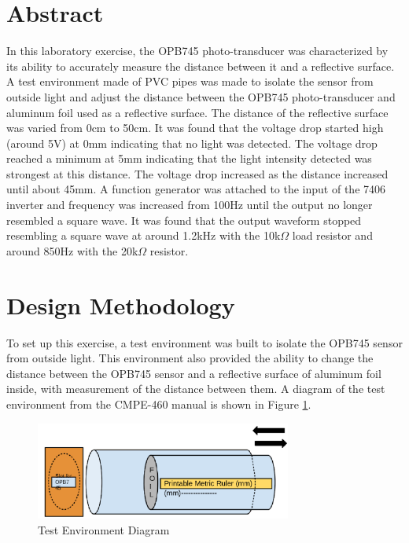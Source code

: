 \documentclass[CMPE]{KGCOEReport}
\begin{document}
\maketitle

\section*{Abstract}

In this laboratory exercise, the OPB745 photo-transducer was characterized by its ability to accurately measure the distance between it and a reflective surface. A test environment made of PVC pipes was made to isolate the sensor from outside light and adjust the distance between the OPB745 photo-transducer and aluminum foil used as a reflective surface. The distance of the reflective surface was varied from 0cm to 50cm. It was found that the voltage drop started high (around 5V) at 0mm indicating that no light was detected. The voltage drop reached a minimum at 5mm indicating that the light intensity detected was strongest at this distance. The voltage drop increased as the distance increased until about 45mm. A function generator was attached to the input of the 7406 inverter and frequency was increased from 100Hz until the output no longer resembled a square wave. It was found that the output waveform stopped resembling a square wave at around 1.2kHz with the 10k$\Omega$ load resistor and around 850Hz with the 20k$\Omega$ resistor.

\section*{Design Methodology}

To set up this exercise, a test environment was built to isolate the OPB745 sensor from outside light. This environment also provided the ability to change the distance between the OPB745 sensor and a reflective surface of aluminum foil inside, with measurement of the distance between them. A diagram of the test environment from the CMPE-460 manual is shown in Figure \ref{fig:env}.

\begin{figure}[H]
    \centering
    \includegraphics[width=0.75\textwidth]{test_env.png}
    \caption{Test Environment Diagram}
    \label{fig:env}
\end{figure}
\end{document}
